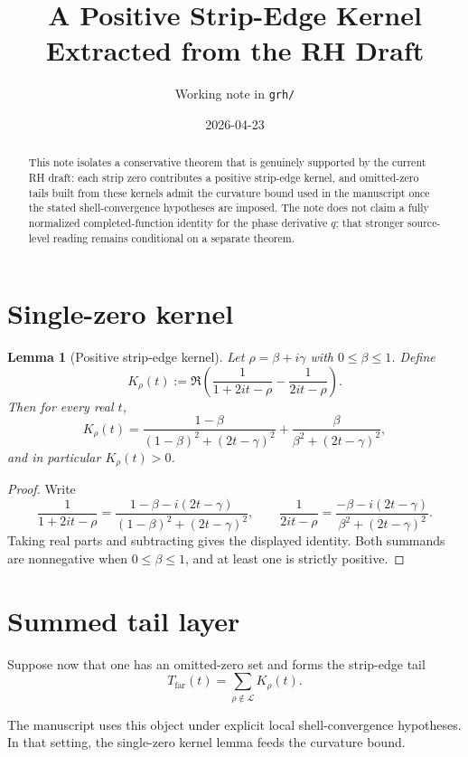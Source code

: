 \documentclass[11pt]{article}
\title{A Positive Strip-Edge Kernel Extracted from the RH Draft}
\author{Working note in \texttt{grh/}}
\date{2026-04-23}
\newtheorem{lemma}{Lemma}
\begin{document}
\maketitle

\begin{abstract}
This note isolates a conservative theorem that is genuinely supported by the
current RH draft: each strip zero contributes a positive strip-edge kernel,
and omitted-zero tails built from these kernels admit the curvature bound used
in the manuscript once the stated shell-convergence hypotheses are imposed. The
note does not claim a fully normalized completed-function identity for the
phase derivative \(q\); that stronger source-level reading remains conditional
on a separate theorem.
\end{abstract}

\section{Single-zero kernel}

\begin{lemma}[Positive strip-edge kernel]
Let \(\rho=\beta+i\gamma\) with \(0\le \beta\le 1\). Define
\[
K_\rho(t):=\Re\left(\frac{1}{1+2it-\rho}-\frac{1}{2it-\rho}\right).
\]
Then for every real \(t\),
\[
K_\rho(t)=
\frac{1-\beta}{(1-\beta)^2+(2t-\gamma)^2}
+
\frac{\beta}{\beta^2+(2t-\gamma)^2},
\]
and in particular \(K_\rho(t)>0\).
\end{lemma}

\begin{proof}
Write
\[
\frac{1}{1+2it-\rho}=
\frac{1-\beta-i(2t-\gamma)}{(1-\beta)^2+(2t-\gamma)^2},
\qquad
\frac{1}{2it-\rho}=
\frac{-\beta-i(2t-\gamma)}{\beta^2+(2t-\gamma)^2}.
\]
Taking real parts and subtracting gives the displayed identity. Both summands
are nonnegative when \(0\le \beta\le 1\), and at least one is strictly
positive.
\end{proof}

\section{Summed tail layer}

Suppose now that one has an omitted-zero set and forms the strip-edge tail
\[
T_{\mathrm{far}}(t)=\sum_{\rho\notin \mathcal L} K_\rho(t).
\]

The manuscript uses this object under explicit local shell-convergence
hypotheses. In that setting, the single-zero kernel lemma feeds the curvature
bound.
\end{document}
